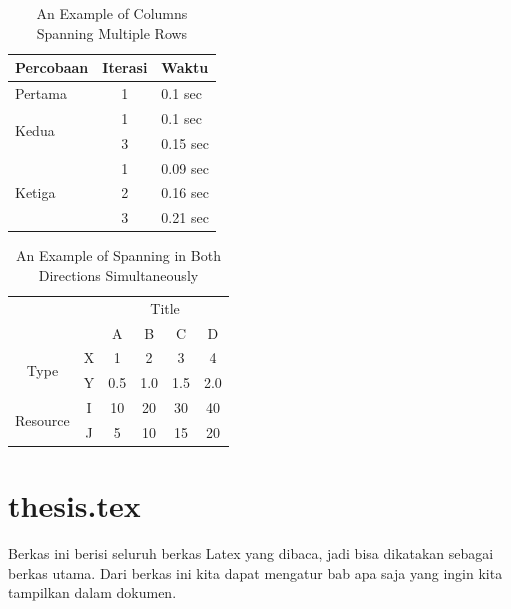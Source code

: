 \begin{table}
	\centering
	\caption{An Example of Columns Spanning Multiple Rows}
	\label{column.spanning}
	\begin{tabular}{|l|c|l|}
		\hline
		Percobaan & Iterasi & Waktu \\
		\hline
		Pertama & 1 & 0.1 sec \\ \hline
		\multirow{2}{*}{Kedua} & 1 & 0.1 sec \\
 		& 3 & 0.15 sec \\ 
 		\hline
		\multirow{3}{*}{Ketiga} & 1 & 0.09 sec \\
 		& 2 & 0.16 sec \\
 		& 3 & 0.21 sec \\ 
 		\hline
	\end{tabular}
\end{table}

\begin{table}
	\centering
	\caption{An Example of Spanning in Both Directions Simultaneously}
	\label{mix.spanning}
	\begin{tabular}{cc|c|c|c|c|}
		\cline{3-6}
		& & \multicolumn{4}{|c|}{Title} \\ \cline{3-6}
		& & A & B & C & D \\ \hline
		\multicolumn{1}{|c|}{\multirow{2}{*}{Type}} &
		\multicolumn{1}{|c|}{X} & 1 & 2 & 3 & 4\\ \cline{2-6}
		\multicolumn{1}{|c|}{}                        &
		\multicolumn{1}{|c|}{Y} & 0.5 & 1.0 & 1.5 & 2.0\\ \cline{1-6}
		\multicolumn{1}{|c|}{\multirow{2}{*}{Resource}} &
		\multicolumn{1}{|c|}{I} & 10 & 20 & 30 & 40\\ \cline{2-6}
		\multicolumn{1}{|c|}{}                        &
		\multicolumn{1}{|c|}{J} & 5 & 10 & 15 & 20\\ \cline{1-6}
	\end{tabular}
\end{table}

\section{thesis.tex}
Berkas ini berisi seluruh berkas Latex yang dibaca, jadi bisa dikatakan sebagai 
berkas utama. Dari berkas ini kita dapat mengatur bab apa saja yang ingin 
kita tampilkan dalam dokumen.


